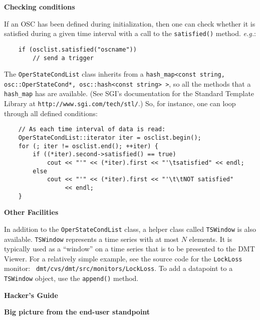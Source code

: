 {\begin{center}
\textbf{{\large Checking conditions}}
\end{center}

If an OSC has been defined during initialization, then one can check
whether it is satisfied during a given time interval with a call to
the \texttt{satisfied()} method. \textit{e.g.}:

\begin{verbatim}
    if (osclist.satisfied("oscname"))
        // send a trigger
\end{verbatim}

The \texttt{OperStateCondList} class inherits from a \texttt{hash\_map<const
  string, osc::OperStateCond*, osc::hash<const string> >}, so all the
methods that a \texttt{hash\_map} has are available.  (See SGI's
documentation for the Standard Template Library at
\texttt{http://www.sgi.com/tech/stl/}.) So, for instance, one can loop
  through all defined conditions:
  
\begin{verbatim}
    // As each time interval of data is read:
    OperStateCondList::iterator iter = osclist.begin();
    for (; iter != osclist.end(); ++iter) {
        if ((*iter).second->satisfied() == true)
            cout << "'" << (*iter).first << "'\tsatisfied" << endl;
        else
            cout << "'" << (*iter).first << "'\t\tNOT satisfied" 
                 << endl;
    }
\end{verbatim}
  
\begin{center}
  \textbf{{\large Other Facilities}}
\end{center}

In addition to the \texttt{OperStateCondList} class, a helper class
called \texttt{TSWindow} is also available.  \texttt{TSWindow}
represents a time series with at most $N$ elements.  It is typically
used as a ``window'' on a time series that is to be presented to the
DMT Viewer.  For a relatively simple example, see the source code for
the \texttt{LockLoss} monitor:
\texttt{~dmt/cvs/dmt/src/monitors/LockLoss}. To add a datapoint to a
\texttt{TSWindow} object, use the \texttt{append()} method.

\newpage

\begin{center}\textbf{{\large Hacker's Guide}}\end{center}

\begin{center}
  \textbf{Big picture from the end-user standpoint}
\end{center}

}
